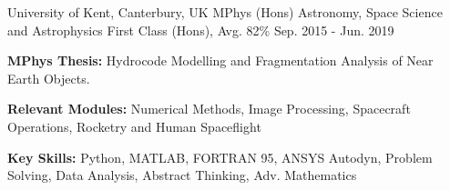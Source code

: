\begin{cventries}

  \cventry
    {University of Kent, Canterbury, UK} %
    {MPhys (Hons) Astronomy, Space Science and Astrophysics} %
    {First Class (Hons), Avg. 82\%} %
    {Sep. 2015 - Jun. 2019} %
    {
      \begin{cvitems} %
         \item {\textbf{MPhys Thesis:} Hydrocode Modelling and Fragmentation Analysis of Near Earth Objects.}
         \item {\textbf{Relevant Modules:} Numerical Methods, Image Processing, Spacecraft Operations, Rocketry and Human Spaceflight}
         \item {\textbf{Key Skills:} Python, MATLAB, FORTRAN 95, ANSYS Autodyn, Problem Solving, Data Analysis, Abstract Thinking, Adv. Mathematics}
      \end{cvitems}
    }
    
\end{cventries}

